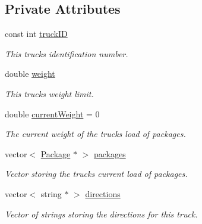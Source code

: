 \subsection*{Private Attributes}
\begin{DoxyCompactItemize}
\item 
const int \hyperlink{classTruck_a7552538334822cb0526b3b714fcc09fc}{truck\+ID}\hypertarget{classTruck_a7552538334822cb0526b3b714fcc09fc}{}\label{classTruck_a7552538334822cb0526b3b714fcc09fc}

\begin{DoxyCompactList}\small\item\em This truck\textquotesingle{}s identification number. \end{DoxyCompactList}\item 
double \hyperlink{classTruck_a51f90c7e56b08f4ad92436233326f746}{weight}\hypertarget{classTruck_a51f90c7e56b08f4ad92436233326f746}{}\label{classTruck_a51f90c7e56b08f4ad92436233326f746}

\begin{DoxyCompactList}\small\item\em This truck\textquotesingle{}s weight limit. \end{DoxyCompactList}\item 
double \hyperlink{classTruck_af1817d5b13eecfd5f3a6037eb76de31f}{current\+Weight} = 0\hypertarget{classTruck_af1817d5b13eecfd5f3a6037eb76de31f}{}\label{classTruck_af1817d5b13eecfd5f3a6037eb76de31f}

\begin{DoxyCompactList}\small\item\em The current weight of the truck\textquotesingle{}s load of packages. \end{DoxyCompactList}\item 
vector$<$ \hyperlink{classPackage}{Package} $\ast$ $>$ \hyperlink{classTruck_a56932c0950c2a2a129e557f003980ffc}{packages}\hypertarget{classTruck_a56932c0950c2a2a129e557f003980ffc}{}\label{classTruck_a56932c0950c2a2a129e557f003980ffc}

\begin{DoxyCompactList}\small\item\em Vector storing the truck\textquotesingle{}s current load of packages. \end{DoxyCompactList}\item 
vector$<$ string $\ast$ $>$ \hyperlink{classTruck_a62316796e456b748a80c870e41e058f4}{directions}\hypertarget{classTruck_a62316796e456b748a80c870e41e058f4}{}\label{classTruck_a62316796e456b748a80c870e41e058f4}

\begin{DoxyCompactList}\small\item\em Vector of strings storing the directions for this truck. \end{DoxyCompactList}\end{DoxyCompactItemize}



